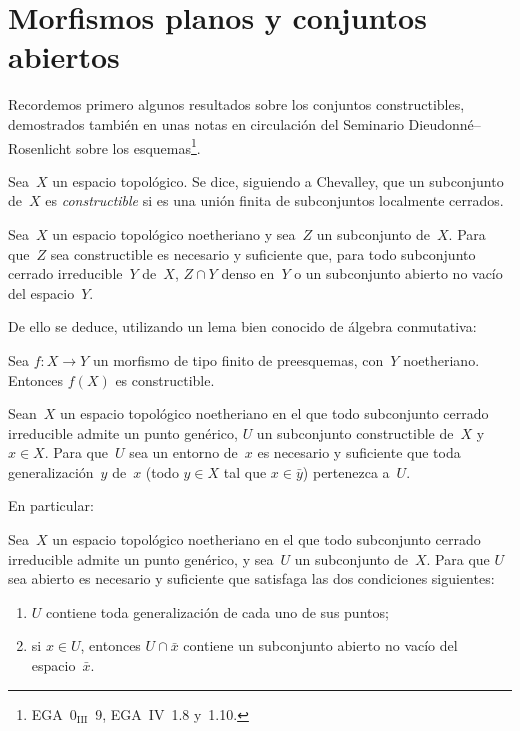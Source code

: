 
\section{Morfismos planos y conjuntos abiertos}
\label{IV.6}

Recordemos primero algunos resultados sobre los conjuntos constructibles,
demostrados también en unas notas en circulación del Seminario
Dieudonné--Rosenlicht sobre los esquemas\footnote{\Cf EGA~0$_\mathrm{III}$~9,
EGA~IV~1.8 y~1.10.}.

Sea~$X$ un espacio topológico. Se dice, siguiendo a Chevalley, que un
subconjunto de~$X$ es \emph{constructible}
%
si es una unión finita de subconjuntos localmente cerrados.

\begin{lemme}
\label{IV.6.1}
Sea~$X$ un espacio topológico noetheriano y sea~$Z$ un subconjunto de~$X$.
Para que~$Z$ sea constructible es necesario y suficiente que, para todo
subconjunto cerrado irreducible~$Y$ de~$X$, $Z\cap Y$
 denso en~$Y$ o
 un subconjunto abierto no
vacío del espacio~$Y$.
\end{lemme}

De ello se deduce, utilizando un lema bien conocido de álgebra conmutativa:

\begin{lemme}[Chevalley]
\label{IV.6.2}
Sea $f\colon X\to Y$ un morfismo de tipo finito de preesquemas, con~$Y$
noetheriano. Entonces $f(X)$ es constructible.
\end{lemme}

\begin{lemme}
\label{IV.6.3}
Sean~$X$ un espacio topológico noetheriano en el que todo subconjunto cerrado
irreducible admite un punto genérico, $U$ un subconjunto constructible de~$X$ y
$x\in X$. Para que~$U$ sea un entorno de~$x$ es necesario y suficiente que
toda generalización~$y$ de~$x$ (\ie todo $y\in X$ tal que $x\in\bar y$)
pertenezca a~$U$.
\end{lemme}

En particular:

\begin{corollaire}
\label{IV.6.4}
Sea~$X$ un espacio topológico noetheriano en el que todo subconjunto cerrado
irreducible admite un punto genérico, y sea~$U$ un subconjunto de~$X$. Para que
$U$ sea abierto es necesario y suficiente que satisfaga las dos condiciones
siguientes:
\begin{enumerate}
\item[(a)] $U$ contiene toda generalización de cada uno de sus puntos;
\item[(b)] si $x\in U$, entonces
$U\cap\bar x$ contiene un subconjunto abierto no vacío del espacio~$\bar x$.
\end{enumerate}
\end{corollaire}

